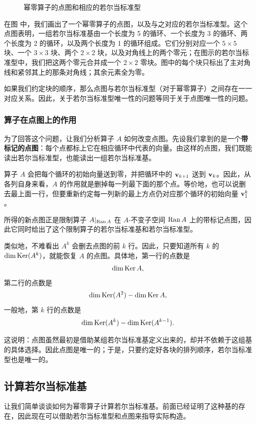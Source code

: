 \begin{figure}[ht]
    \centering
    
    \caption{幂零算子的点图和相应的若尔当标准型}
    \label{fig:06}
\end{figure}

在图 中，我们画出了一个幂零算子的点图，以及与之对应的若尔当标准型。这个点图表明，一组若尔当标准基由一个长度为 5 的循环、一个长度为 3 的循环、两个长度为 2 的循环，以及两个长度为 1 的循环组成。它们分别对应一个 $5\times5$ 块、一个 $3\times3$ 块、两个 $2\times2$ 块，以及对角线上的两个零元；在图示的若尔当标准型中，我们把这两个零元合并成一个 $2\times2$ 零块。图中的每个块只标出了主对角线和紧邻其上的那条对角线；其余元素全为零。

如果我们约定块的顺序，那么点图与若尔当标准型（对于幂零算子）之间存在一一对应关系。因此，关于若尔当标准型唯一性的问题等同于关于点图唯一性的问题。

\subsubsection{算子在点图上的作用}\label{sec:09-04-03-01}

为了回答这个问题，让我们分析算子 $A$ 如何改变点图。先设我们拿到的是一个\textbf{带标记的点图}：每个点都标上它在相应循环中代表的向量。由这样的点图，我们既能读出若尔当标准型，也能读出一组若尔当标准基。

算子 $A$ 会把每个循环的初始向量送到零，并把循环中的 $\mathbf{v}_{k+1}$ 送到 $\mathbf{v}_k$。因此，从各列自身来看，$A$ 的作用就是删掉每一列最下面的那个点。等价地，也可以说删去最上面一行，但要重新约定每一列新的最上方点仍对应那个循环的初始向量 $\mathbf{v}_1^k$。

所得的新点图正是限制算子 $A|_{\operatorname{Ran} A}$ 在 $A$-不变子空间 $\operatorname{Ran} A$ 上的带标记点图，因此它同时给出了这个限制算子的若尔当标准基和若尔当标准型。

类似地，不难看出 $A^k$ 会删去点图的前 $k$ 行。因此，只要知道所有 $k$ 的 $\dim\operatorname{Ker}(A^k)$，就能恢复 $A$ 的点图。具体地，第一行的点数是
$$\dim\operatorname{Ker} A,$$
第二行的点数是
$$\dim\operatorname{Ker}(A^2)-\dim\operatorname{Ker} A,$$
一般地，第 $k$ 行的点数是
$$\dim\operatorname{Ker}(A^k)-\dim\operatorname{Ker}(A^{k-1}).$$

这说明：点图虽然最初是借助某组若尔当标准基定义出来的，却并不依赖于这组基的具体选择。因此点图是唯一的；于是，只要约定好各块的排列顺序，若尔当标准型也是唯一的。

\subsection{计算若尔当标准基}\label{sec:09-04-04}
让我们简单谈谈如何为幂零算子计算若尔当标准基。前面已经证明了这种基的存在，因此现在可以借助若尔当标准型和点图来指导实际构造。

